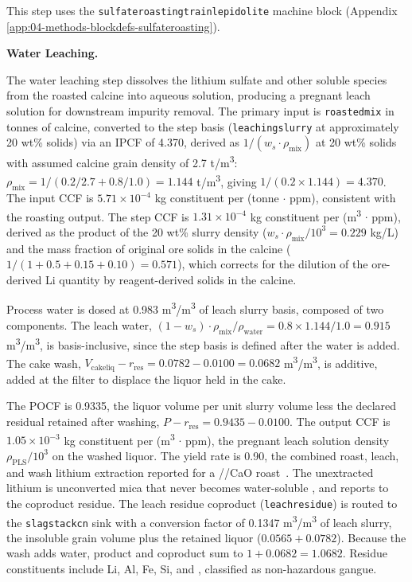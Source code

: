 \documentclass{article}
\renewcommand\_{\textunderscore\allowbreak}
\begin{document}
This step uses the \texttt{sulfate\_roasting\_train\_lepidolite} machine block (Appendix \ref{app:04-methods-blockdefs-sulfateroasting}).

\medskip
\noindent\textbf{Water Leaching.}\quad

The water leaching step dissolves the lithium sulfate and other soluble species from the roasted calcine into aqueous solution, producing a pregnant leach solution for downstream impurity removal. The primary input is \texttt{roasted\_mix} in tonnes of calcine, converted to the step basis (\texttt{leaching\_slurry} at approximately 20 wt\% solids) via an IPCF of 4.370, derived as $1/(w_s \cdot \rho_{\text{mix}})$ at 20 wt\% solids with assumed calcine grain density of 2.7 \si{t/m^3}: $\rho_{\text{mix}} = 1/(0.2/2.7 + 0.8/1.0) = 1.144$ \si{t/m^3}, giving $1/(0.2 \times 1.144) = 4.370$. The input CCF is $5.71 \times 10^{-4}$ kg constituent per (tonne $\cdot$ ppm), consistent with the roasting output. The step CCF is $1.31 \times 10^{-4}$ kg constituent per (\si{m^3} $\cdot$ ppm), derived as the product of the 20 wt\% slurry density ($w_s \cdot \rho_{\text{mix}} / 10^3 = 0.229$ kg/L) and the mass fraction of original ore solids in the calcine ($1 / (1 + 0.5 + 0.15 + 0.10) = 0.571$), which corrects for the dilution of the ore-derived Li quantity by reagent-derived solids in the calcine.

Process water is dosed at 0.983 \si{m^3/m^3} of leach slurry basis, composed of two components. The leach water, $(1 - w_s) \cdot \rho_{\text{mix}} / \rho_{\text{water}} = 0.8 \times 1.144 / 1.0 = 0.915$ \si{m^3/m^3}, is basis-inclusive, since the step basis is defined after the water is added. The cake wash, $V_\text{cakeliq} - r_\text{res} = 0.0782 - 0.0100 = 0.0682$ \si{m^3/m^3}, is additive, added at the filter to displace the liquor held in the cake.

The POCF is 0.9335, the liquor volume per unit slurry volume less the declared residual retained after washing, $P - r_\text{res} = 0.9435 - 0.0100$. The output CCF is $1.05 \times 10^{-3}$ kg constituent per (\si{m^3} $\cdot$ ppm), the pregnant leach solution density $\rho_\text{PLS}/10^3$ on the washed liquor. The yield rate is 0.90, the combined roast, leach, and wash lithium extraction reported for a //CaO roast~\cite{gaoLithiumExtractionHard2023, zhaoRecentAdvancesLithium2023}. The unextracted lithium is unconverted mica that never becomes water-soluble , and reports to the coproduct residue. The leach residue coproduct (\texttt{leach\_residue}) is routed to the \texttt{slag\_stack\_cn\_65} sink with a conversion factor of 0.1347 \si{m^3/m^3} of leach slurry, the insoluble grain volume plus the retained liquor ($0.0565 + 0.0782$). Because the wash adds water, product and coproduct sum to $1 + 0.0682 = 1.0682$. Residue constituents include Li, Al, Fe, Si, and , classified as non-hazardous gangue.
\end{document}
